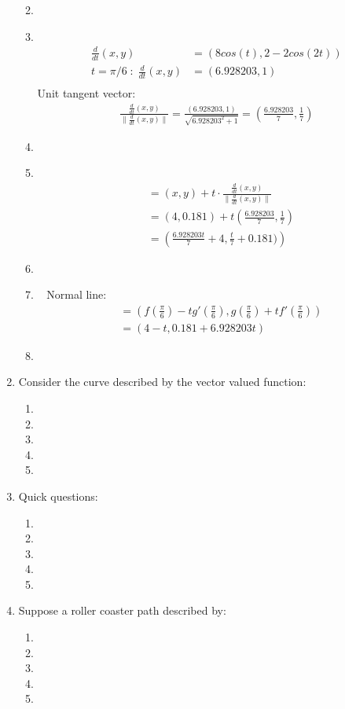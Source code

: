 \documentclass[11pt]{article}
\newcommand\Item[1][]{%
  \ifx\relax#1\relax  \item \else \item[#1] \fi
  \abovedisplayskip=0pt\abovedisplayshortskip=0pt~\vspace*{-\baselineskip}}
\begin{document}
\begin{enumerate}
\begin{enumerate}
        \Item
        \begin{align*}
            \frac{d}{dt}(x,y) &= (8cos(t), 2 - 2cos(2t))\\
            t=\pi/6 \;:\; \frac{d}{dt}(x,y) &= (6.928203,1)\\
        \end{align*} 
        Unit tangent vector:
        \begin{align*}
           \frac{\frac{d}{dt}(x,y)}{\| \frac{d}{dt}(x,y) \|} = \frac{(6.928203,1)}{\sqrt{6.928203^2+1}} = \left(\frac{6.928203}{7},\frac{1}{7}\right) 
        \end{align*}
        \Item
        \begin{align*}
            &= (x,y) + t{\cdot} \frac{\frac{d}{dt}(x,y)}{\| \frac{d}{dt}(x,y) \|}\\
            &= (4,0.181) + t\left(\frac{6.928203}{7},\frac{1}{7}\right)\\
            &= \left(\frac{6.928203t}{7}+4,\frac{t}{7}+0.181)\right)
        \end{align*} 
        \Item 
        Normal line:
        \begin{align*}
            &= \left( f(\frac{\pi}{6}) - tg'(\frac{\pi}{6}), g(\frac{\pi}{6}) + tf'(\frac{\pi}{6}) \right) \\
            &= \left( 4 - t, 0.181 + 6.928203t \right)
        \end{align*}
        \item 
    \end{enumerate}
    \item Consider the curve described by the vector valued function:
    \begin{enumerate}
        \item 
        \item 
        \item 
        \item 
        \item 
    \end{enumerate}
    \item Quick questions:
    \begin{enumerate}
        \item 
        \item 
        \item  
        \item  
        \item  
    \end{enumerate}
    \item Suppose a roller coaster path described by:
    \begin{enumerate}
        \item 
        \item 
        \item  
        \item  
        \item  
    \end{enumerate}
\end{enumerate}
\end{document}
